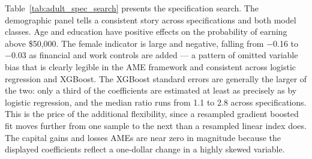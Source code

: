 \documentclass[conference]{IEEEtran}
\begin{document}
	Table~\ref{tab:adult_spec_search} presents the specification search. The demographic panel tells a consistent story across specifications and both model classes. Age and education have positive effects on the probability of earning above \$50,000. The female indicator is large and negative, falling from $-$0.16 to $-$0.03 as financial and work controls are added --- a pattern of omitted variable bias that is clearly legible in the AME framework and consistent across logistic regression and XGBoost. The XGBoost standard errors are generally the larger of the two: only a third of the coefficients are estimated at least as precisely as by logistic regression, and the median ratio runs from 1.1 to 2.8 across specifications. This is the price of the additional flexibility, since a resampled gradient boosted fit moves further from one sample to the next than a resampled linear index does. The capital gains and losses AMEs are near zero in magnitude because the displayed coefficients reflect a one-dollar change in a highly skewed variable.
	
\end{document}
